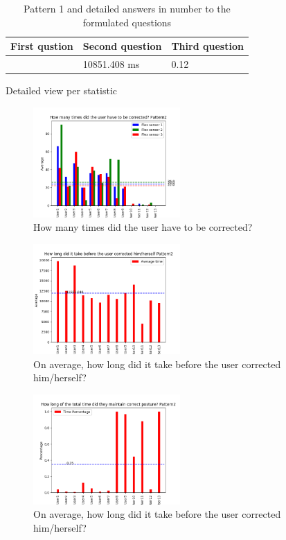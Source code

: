 \documentclass[sigconf]{acmart}
\begin{document}
\begin{table}[htb]
\caption{Pattern 1 and detailed answers in number to the formulated questions}
\label{my-label}
\begin{tabular}{|l|l|l|}
\hline
\multicolumn{1}{|c|}{\textbf{First qustion}} & \multicolumn{1}{c|}{\textbf{Second question}} & \multicolumn{1}{c|}{\textbf{Third question}} \\ \hline
 [27.0, 34.0, 22.0] & 10851.408 ms & 0.12%
\end{tabular}
\end{table}

Detailed view per statistic
\begin{figure}[h!]
\centering
\includegraphics[width=0.5\textwidth, scale=1]{p2_q1.png}
\caption{How many times did the user have to be corrected?}
\end{figure}

\begin{figure}[h!]
\centering
\includegraphics[width=0.5\textwidth, scale=1]{p2_q2.png}
\caption{On average, how long did it take before the user corrected him/herself?}
\end{figure}

\begin{figure}[h!]
\centering
\includegraphics[width=0.5\textwidth, scale=1]{p2_q3.png}
\caption{On average, how long did it take before the user corrected him/herself?}
\end{figure}
\end{document}
